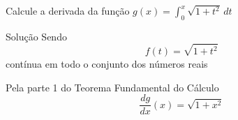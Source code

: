\begin{question}
  Calcule a derivada da função \(g(x)=\int_0^x \sqrt{1+t^2} \,dt\)
\end{question}

\begin{resolution}{Solução}
  Sendo
  \[
    f(t)= \sqrt{1+t^2}
  \]
  contínua em todo o conjunto dos números reais

  \pause
  Pela parte 1 do Teorema Fundamental do Cálculo
  \[
    \frac{dg}{dx}(x)=\sqrt{1+x^2}
  \]
\end{resolution}

